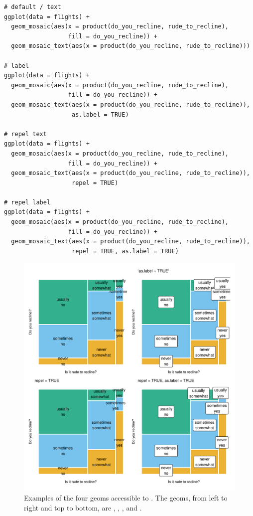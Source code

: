 \begin{verbatim}
# default / text
ggplot(data = flights) +
  geom_mosaic(aes(x = product(do_you_recline, rude_to_recline), 
                  fill = do_you_recline)) +
  geom_mosaic_text(aes(x = product(do_you_recline, rude_to_recline)))

# label
ggplot(data = flights) +
  geom_mosaic(aes(x = product(do_you_recline, rude_to_recline), 
                  fill = do_you_recline)) +
  geom_mosaic_text(aes(x = product(do_you_recline, rude_to_recline)), 
                   as.label = TRUE)
  
# repel text
ggplot(data = flights) +
  geom_mosaic(aes(x = product(do_you_recline, rude_to_recline), 
                  fill = do_you_recline)) +
  geom_mosaic_text(aes(x = product(do_you_recline, rude_to_recline)), 
                   repel = TRUE)
  
# repel label
ggplot(data = flights) +
  geom_mosaic(aes(x = product(do_you_recline, rude_to_recline),
                  fill = do_you_recline)) +
  geom_mosaic_text(aes(x = product(do_you_recline, rude_to_recline)), 
                   repel = TRUE, as.label = TRUE)
\end{verbatim}

\begin{figure}

{\centering \includegraphics[width=1\linewidth]{RJ-2023-013_files/figure-latex/label-opts-1} 

}

\caption{Examples of the four geoms accessible to . The geoms, from left to right and top to bottom, are , , , and .}\label{fig:label-opts}
\end{figure}

